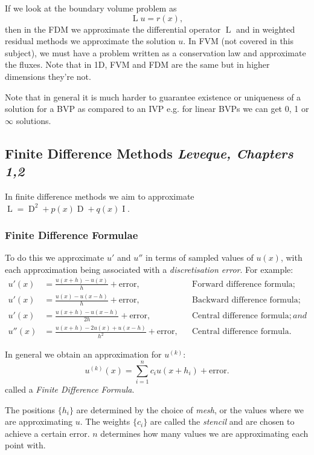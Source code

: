 \documentclass[12pt, a4paper]{article}
\theoremstyle{definition}
\theoremstyle{remark}
\numberwithin{equation}{section}
\begin{document}
If we look at the boundary volume problem as
\begin{equation*}
\operatorname{L}u=r(x),
\end{equation*}
then in the FDM we approximate the differential operator $\operatorname{L}$ and in weighted residual methods we approximate the solution $u$. 
In FVM (not covered in this subject), we must have a problem written as a conservation law and approximate the fluxes. 
Note that in 1D, FVM and FDM are the same but in higher dimensions they're not. 

Note that in general it is much harder to guarantee existence or uniqueness of a solution for a BVP as compared to an IVP e.g. for linear BVPs we can get
0, 1 or $\infty$ solutions.

\newpage
\subsection[Finite Difference Methods]{Finite Difference Methods \small {\emph{Leveque, Chapters 1,2}}}
In finite difference methods we aim to approximate $\operatorname{L}=\operatorname{D}^{2} + p(x)\operatorname{D}+q(x)\operatorname{I}$.

\subsubsection{Finite Difference Formulae}

To do this we approximate $u'$ and $u''$ in terms of sampled values of $u(x)$, with each approximation being associated with a
\emph{discretisation error}. For example:
\begin{align*}
u'(x)&=\frac{u(x+h)-u(x)}{h} + \text{error}, &&\mbox{Forward difference formula};\\
u'(x)&=\frac{u(x)-u(x-h)}{h} + \text{error}, &&\mbox{Backward difference formula};\\
u'(x)&=\frac{u(x+h)-u(x-h)}{2h} + \text{error}, &&\mbox{Central difference formula}; and\\
u''(x)&=\frac{u(x+h)-2u(x)+u(x-h)}{h^2} + \text{error}, &&\mbox{Central difference formula}.
\end{align*}

In general we obtain an approximation for $u^{(k)}$:
\begin{equation*}
u^{(k)}(x) =  \sum_{i=1}^n c_i u(x+h_i) +\text{error}.
\end{equation*}
called a \emph{Finite Difference Formula}.

The positions $\{h_i\}$ are determined by the choice of \emph{mesh}, or the values where we are approximating $u$.
The weights $\{c_i \}$ are called the \emph{stencil} and are chosen to achieve a certain error.
$n$ determines how many values we are approximating each point with.
\end{document}
